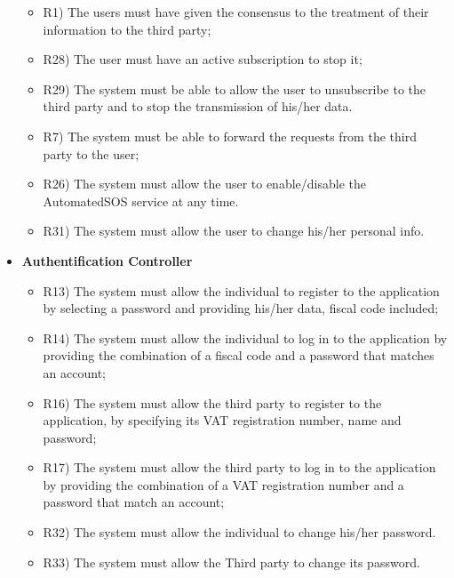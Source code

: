 \begin{itemize}
		\begin{itemize}
			\item R1) The users must have given the consensus to the treatment of their information to the third party;\\
			\item R28) The user must have an active subscription to stop it;\\
	 		\item R29) The system must be able to allow the user to unsubscribe to the third party and to stop the transmission of his/her data.\\
	 		\item R7) The system must be able to forward the requests from the third party to the user;\\
	 		\item R26) The system must allow the user to enable/disable the AutomatedSOS service at any time.\\
			\item R31) The system must allow the user to change his/her personal info.\\
		\end{itemize}
		\item \textbf{Authentification Controller}
		\begin{itemize}
			\item R13) The system must allow the individual to register to the application by selecting a password and providing his/her data, fiscal code included;\\
			\item R14) The system must allow the individual to log in to the application by providing the combination of a fiscal code and a password that matches an account;\\
			\item R16) The system must allow the third party to register to the application, by specifying its VAT registration number, name and password;\\
			\item R17) The system must allow the third party to log in to the application by providing the combination of a VAT registration number and a password that match an account;\\
			\item R32) The system must allow the individual to change his/her password.\\
			\item R33) The system must allow the Third party to change its password.\\

\end{itemize}
\end{itemize}
